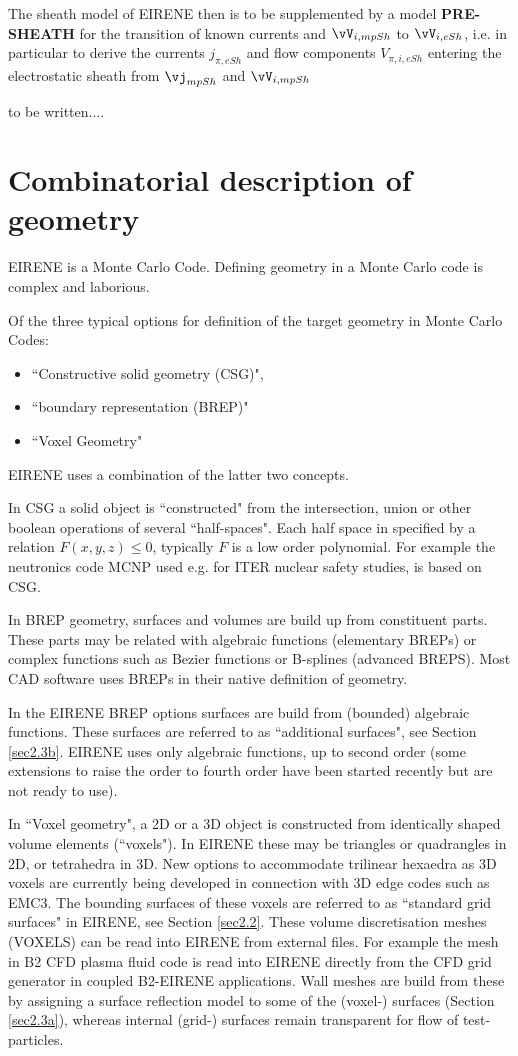The sheath model of EIRENE then is to be supplemented by a model \textbf{PRE-SHEATH} for the transition of known currents and $\vV_{i,mpSh}$  to $\vV_{i,eSh}$, i.e.
in particular to derive the currents $j_{\pi,eSh}$ and flow components $V_{\pi,i,eSh}$ entering the electrostatic sheath from $\vj_{mpSh}$ and $\vV_{i,mpSh}$

to be written....

\newpage
\section{Combinatorial description of geometry} \label{sec1.5}
EIRENE is a Monte Carlo Code. Defining geometry in a Monte Carlo code is complex and laborious.


Of the three typical options for definition of the target geometry in Monte Carlo Codes:
\begin{itemize}
\item {}
``Constructive solid geometry (CSG)",
\item
    ``boundary representation (BREP)"
\item
     ``Voxel Geometry"
\end{itemize}
EIRENE uses a combination of the latter two concepts.

\medskip
In CSG a solid object is ``constructed" from the intersection, union or other boolean operations of several ``half-spaces".
Each half space in specified by a relation $F(x,y,z)\le 0$, typically $F$ is a low order polynomial.
For example the neutronics code MCNP used e.g. for ITER nuclear safety studies, is based on CSG.

\medskip
In BREP geometry, surfaces and volumes are build up from constituent parts.
These parts may be related with algebraic functions (elementary BREPs)
or complex functions such as Bezier functions or B-splines (advanced BREPS).
Most CAD software uses BREPs in their native definition of geometry.

In the EIRENE BREP options surfaces are build from (bounded) algebraic functions.
These surfaces are referred to as ``additional surfaces", see Section \ref{sec2.3b}.
EIRENE uses only algebraic functions, up to second order
(some  extensions to raise the order to fourth order have been started recently but are not ready to use).

\medskip
In ``Voxel geometry", a 2D or a 3D object is constructed from identically shaped volume elements (``voxels"). In EIRENE these may be triangles
 or quadrangles in 2D, or tetrahedra in 3D. New options to accommodate trilinear hexaedra as 3D voxels are currently being developed in connection with 3D edge codes such as EMC3. The bounding surfaces of these voxels are referred to as
``standard grid surfaces" in EIRENE, see Section \ref{sec2.2}. These volume discretisation meshes (VOXELS) can be read into EIRENE
from external files. For example the mesh in B2 CFD plasma fluid code is read into EIRENE directly from the CFD grid generator in
coupled B2-EIRENE applications.
Wall meshes are build from these by assigning
a surface reflection model to some of the (voxel-) surfaces (Section \ref{sec2.3a}), whereas internal (grid-) surfaces remain transparent for flow of test-particles.

